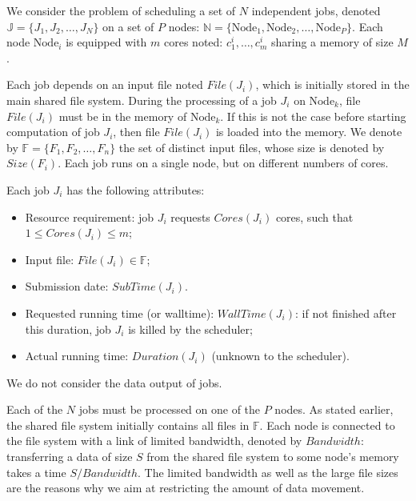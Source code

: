 \documentclass[conference,10pt]{IEEEtran}
\newcommand{\Node}[1]{\ensuremath{\mathrm{Node}_{#1}}\xspace}
\newcommand{\file}{\ensuremath{\mathit{File}}\xspace}
\newcommand{\size}{\ensuremath{\mathit{Size}}\xspace}
\newcommand{\memory}{\ensuremath{\mathit{M}}\xspace}
\newcommand{\duration}{\mathit{Duration}\xspace}
\newcommand{\bandwidth}{\mathit{Bandwidth}\xspace}
\newcommand{\core}{\mathit{Cores}\xspace}
\newcommand{\submissiontime}{\mathit{SubTime}\xspace}
\newcommand{\walltime}{\mathit{WallTime}\xspace}
\newcommand{\fileset}{\ensuremath{\mathbb{F}}\xspace}
\newcommand{\jobset}{\ensuremath{\mathbb{J}}\xspace}
\newcommand{\nodeset}{\ensuremath{\mathbb{N}}\xspace}
\begin{document}
We consider the problem of scheduling a set of $N$ independent jobs,
denoted $\jobset = \{J_1, J_2, \ldots, J_N\}$ on a set of $P$ nodes:
$\nodeset = \{\Node{1}, \Node{2}, \ldots, \Node{P}\}$.
Each node $\Node{i}$ is equipped with $m$ cores noted:
$c^i_1,\ldots,c^i_m$ sharing a memory of size $\memory$.

Each job depends on an input file noted $\file(J_i)$, which is
initially stored in the main shared file system.  During the
processing of a job $J_i$ on $\Node{k}$, file $\file(J_i)$ must be in
the memory of $\Node{k}$. If this is not the case before starting
computation of job $J_i$, then file $\file(J_i)$ is loaded into the
memory.  We denote by $\fileset = \{F_1, F_2, \ldots, F_n\}$ the set
of distinct input files, whose size is denoted by $\size(F_i)$. Each
job runs on a single node, but on different numbers of cores.



Each job $J_i$ has the following attributes:
\begin{itemize}
\item Resource requirement: job $J_i$ requests $\core(J_i)$  cores, such that $1 \leq \core(J_i) \leq m$;
\item Input file: $\file(J_i) \in \fileset$;
\item Submission date: $\submissiontime(J_i)$.
\item Requested running time (or walltime): $\walltime(J_i)$: if not
  finished after this duration, job $J_i$ is killed by the scheduler;
\item Actual running time: $\duration(J_i)$ (unknown to  the scheduler).
\end{itemize}

We do not consider the data output of jobs.

Each of the $N$ jobs must be processed on one of the $P$ nodes.  As
stated earlier, the shared file system initially contains all files
in $\fileset$.  Each node is connected to the file system with a link
of limited bandwidth, denoted by $\bandwidth$: transferring a data of
size $S$ from the shared file system to some node's memory takes a
time $S/\bandwidth$.
The limited bandwidth
as well as the large file sizes are the reasons why we aim at
restricting the amount of data movement.
\end{document}
